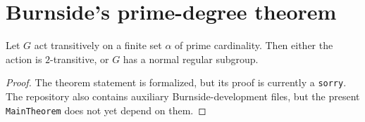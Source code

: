 \section{Burnside's prime-degree theorem}

\begin{theorem}
\label{thm:burnside-prime-degree}
\notready
Let $G$ act transitively on a finite set $\alpha$ of prime cardinality. Then either the action is $2$-transitive, or $G$ has a normal regular subgroup.
\end{theorem}

\begin{proof}
The theorem statement is formalized, but its proof is currently a \texttt{sorry}. The repository also contains auxiliary Burnside-development files, but the present \texttt{MainTheorem} does not yet depend on them.
\end{proof}
